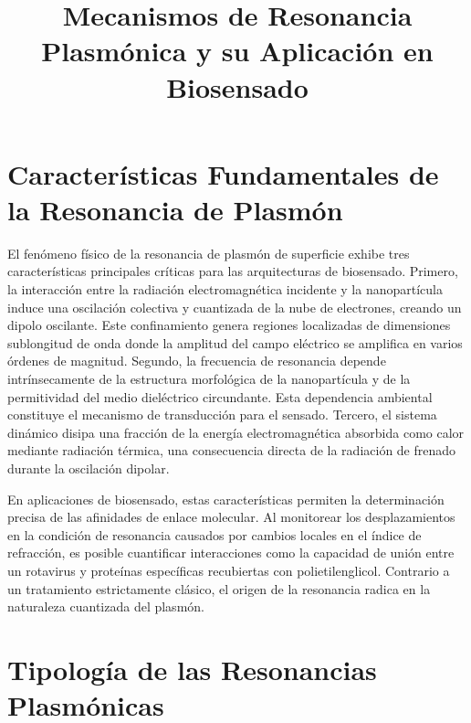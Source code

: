 \documentclass[pdflatex,sn-mathphys-num]{sn-jnl}
\theoremstyle{thmstyleone}%
\theoremstyle{thmstyletwo}%
\theoremstyle{thmstylethree}%
\begin{document}
\title[Mecanismos de Resonancia Plasmónica]{Mecanismos de Resonancia
Plasmónica y su Aplicación en Biosensado}

\author{ }


\maketitle

\section{Características Fundamentales de la Resonancia de Plasmón}
\label{sec:caracteristicas}

El fenómeno físico de la resonancia de plasmón de superficie exhibe tres
características principales críticas para las arquitecturas de biosensado.
Primero, la interacción entre la radiación electromagnética incidente y la
nanopartícula induce una oscilación colectiva y cuantizada de la nube de
electrones, creando un dipolo oscilante. Este confinamiento genera regiones
localizadas de dimensiones sublongitud de onda donde la amplitud del campo
eléctrico se amplifica en varios órdenes de magnitud. Segundo, la frecuencia
de resonancia depende intrínsecamente de la estructura morfológica de la
nanopartícula y de la permitividad del medio dieléctrico circundante. Esta
dependencia ambiental constituye el mecanismo de transducción para el sensado.
Tercero, el sistema dinámico disipa una fracción de la energía
electromagnética absorbida como calor mediante radiación térmica, una
consecuencia directa de la radiación de frenado durante la oscilación dipolar.

En aplicaciones de biosensado, estas características permiten la determinación
precisa de las afinidades de enlace molecular. Al monitorear los
desplazamientos en la condición de resonancia causados por cambios locales en
el índice de refracción, es posible cuantificar interacciones como la
capacidad de unión entre un rotavirus y proteínas específicas recubiertas con
polietilenglicol. Contrario a un tratamiento estrictamente clásico, el origen
de la resonancia radica en la naturaleza cuantizada del plasmón.

\section{Tipología de las Resonancias Plasmónicas}
\label{sec:tipologia}
\end{document}
